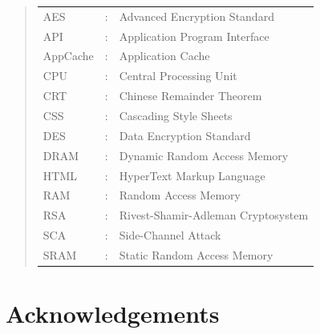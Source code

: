 \documentclass[10pt,a4paper,twoside]{book}
\begin{document}
\begin{quote}
\noindent
\begin{tabular}{lcl}

AES			   	 	&:	   & Advanced Encryption Standard							 \\	
API					&:     & Application Program Interface							 \\
AppCache		   	 	&:	   & Application Cache   									 \\	
CPU					&:	   & Central Processing Unit									 \\
CRT					&:	   & Chinese Remainder Theorem								 \\
CSS					&:	   & Cascading Style Sheets									 \\
DES					&:	   & Data Encryption Standard								 \\
DRAM					&:	   & Dynamic Random Access Memory							 \\
HTML					&:     & HyperText Markup Language								 \\
RAM					&:	   & Random Access Memory									 \\
RSA					&:	   & Rivest-Shamir-Adleman Cryptosystem				    		 \\
SCA					&:	   & Side-Channel Attack										 \\	
SRAM					&:	   & Static Random Access Memory								 \\
\end{tabular}
\end{quote}


\chapter*{Acknowledgements}
\end{document}
